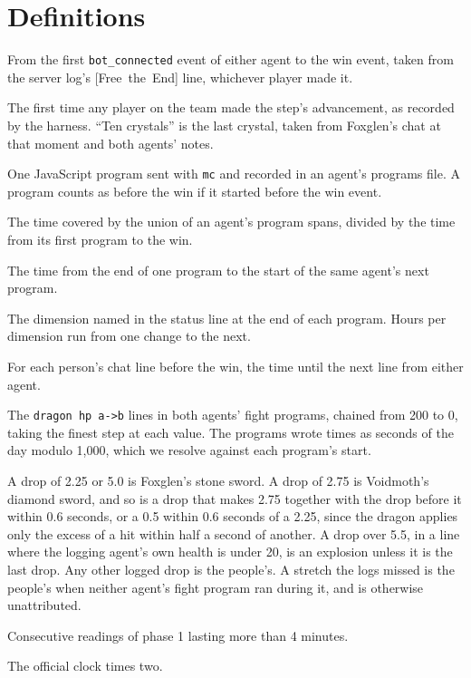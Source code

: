 \documentclass[11pt,a4paper]{article}
\newcommand{\adv}[1]{\mbox{\textsf{[#1]}}}
\begin{document}



\appendix
\section{Definitions}
\label{app:defs}

\begin{description}[leftmargin=0pt,itemsep=3pt,font=\normalfont\bfseries]
  \item[Official clock.] From the first \texttt{bot\_connected} event of either agent to the win event, taken from the server log's \adv{Free the End} line, whichever player made it.
  \item[Step.] The first time any player on the team made the step's advancement, as recorded by the harness. ``Ten crystals'' is the last crystal, taken from Foxglen's chat at that moment and both agents' notes.
  \item[Program.] One JavaScript program sent with \texttt{mc} and recorded in an agent's programs file. A program counts as before the win if it started before the win event.
  \item[Running share.] The time covered by the union of an agent's program spans, divided by the time from its first program to the win.
  \item[Gap between programs.] The time from the end of one program to the start of the same agent's next program.
  \item[Dimension.] The dimension named in the status line at the end of each program. Hours per dimension run from one change to the next.
  \item[Wait for an answer.] For each person's chat line before the win, the time until the next line from either agent.
  \item[Dragon health.] The \texttt{dragon hp a->b} lines in both agents' fight programs, chained from 200 to 0, taking the finest step at each value. The programs wrote times as seconds of the day modulo 1,000, which we resolve against each program's start.
  \item[Damage sources.] A drop of 2.25 or 5.0 is Foxglen's stone sword. A drop of 2.75 is Voidmoth's diamond sword, and so is a drop that makes 2.75 together with the drop before it within 0.6 seconds, or a 0.5 within 0.6 seconds of a 2.25, since the dragon applies only the excess of a hit within half a second of another. A drop over 5.5, in a line where the logging agent's own health is under 20, is an explosion unless it is the last drop. Any other logged drop is the people's. A stretch the logs missed is the people's when neither agent's fight program ran during it, and is otherwise unattributed.
  \item[Strafing stretch.] Consecutive readings of phase 1 lasting more than 4 minutes.
  \item[Agent-hours.] The official clock times two.
\end{description}
\end{document}

